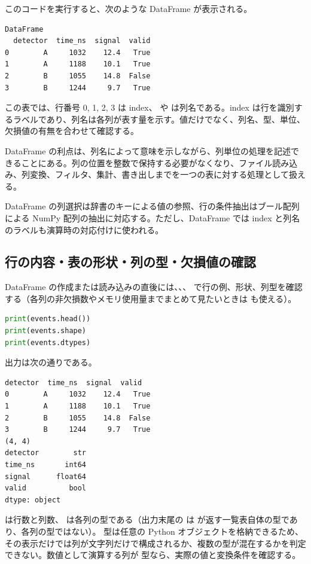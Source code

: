 このコードを実行すると、次のような DataFrame が表示される。

\begin{lstlisting}[numbers=none, xleftmargin=2\zw]
DataFrame
  detector  time_ns  signal  valid
0        A     1032    12.4   True
1        A     1188    10.1   True
2        B     1055    14.8  False
3        B     1244     9.7   True
\end{lstlisting}

この表では、行番号 0, 1, 2, 3 は index、 や  は列名である。index は行を識別するラベルであり、列名は各列が表す量を示す。値だけでなく、列名、型、単位、欠損値の有無を合わせて確認する。

DataFrame の利点は、列名によって意味を示しながら、列単位の処理を記述できることにある。列の位置を整数で保持する必要がなくなり、ファイル読み込み、列変換、フィルタ、集計、書き出しまでを一つの表に対する処理として扱える。

DataFrame の列選択は辞書のキーによる値の参照、行の条件抽出はブール配列による NumPy 配列の抽出に対応する。ただし、DataFrame では index と列名のラベルも演算時の対応付けに使われる。

\subsection{行の内容・表の形状・列の型・欠損値の確認}

DataFrame の作成または読み込みの直後には、、、 で行の例、形状、列型を確認する（各列の非欠損数やメモリ使用量までまとめて見たいときは  も使える）。

\begin{lstlisting}[language=Python]
print(events.head())
print(events.shape)
print(events.dtypes)
\end{lstlisting}

出力は次の通りである。

\begin{lstlisting}[numbers=none, xleftmargin=2\zw]
  detector  time_ns  signal  valid
0        A     1032    12.4   True
1        A     1188    10.1   True
2        B     1055    14.8  False
3        B     1244     9.7   True
(4, 4)
detector        str
time_ns       int64
signal      float64
valid          bool
dtype: object
\end{lstlisting}

 は行数と列数、 は各列の型である（出力末尾の  は  が返す一覧表自体の型であり、各列の型ではない）。 型は任意の Python オブジェクトを格納できるため、その表示だけでは列が文字列だけで構成されるか、複数の型が混在するかを判定できない。数値として演算する列が  型なら、実際の値と変換条件を確認する。

